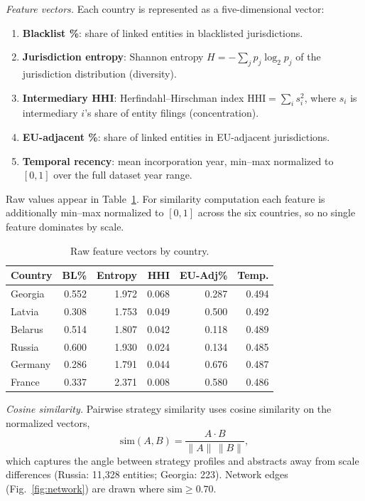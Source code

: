 \documentclass[9pt,twoside]{pnas-new}
\begin{document}
\textit{Feature vectors.} Each country is represented as a five-dimensional vector:
\begin{enumerate}
\item \textbf{Blacklist \%}: share of linked entities in blacklisted jurisdictions.
\item \textbf{Jurisdiction entropy}: Shannon entropy $H=-\sum_j p_j\log_2 p_j$ of the jurisdiction distribution (diversity).
\item \textbf{Intermediary HHI}: Herfindahl--Hirschman index $\text{HHI}=\sum_i s_i^2$, where $s_i$ is intermediary $i$'s share of entity filings (concentration).
\item \textbf{EU-adjacent \%}: share of linked entities in EU-adjacent jurisdictions.
\item \textbf{Temporal recency}: mean incorporation year, min--max normalized to $[0,1]$ over the full dataset year range.
\end{enumerate}
Raw values appear in Table~\ref{tab:features}. For similarity computation each feature is additionally min--max normalized to $[0,1]$ across the six countries, so no single feature dominates by scale.

\begin{table}[h!]
\centering
\caption{Raw feature vectors by country.}
\label{tab:features}
\begin{tabular}{lrrrrr}
Country & BL\% & Entropy & HHI & EU-Adj\% & Temp. \\
\midrule
Georgia  & 0.552 & 1.972 & 0.068 & 0.287 & 0.494 \\
Latvia   & 0.308 & 1.753 & 0.049 & 0.500 & 0.492 \\
Belarus  & 0.514 & 1.807 & 0.042 & 0.118 & 0.489 \\
Russia   & 0.600 & 1.930 & 0.024 & 0.134 & 0.485 \\
Germany  & 0.286 & 1.791 & 0.044 & 0.676 & 0.487 \\
France   & 0.337 & 2.371 & 0.008 & 0.580 & 0.486 \\
\bottomrule
\end{tabular}
\end{table}

\textit{Cosine similarity.} Pairwise strategy similarity uses cosine similarity on the normalized vectors,
\[
\text{sim}(A,B)=\frac{A\cdot B}{\lVert A\rVert\,\lVert B\rVert},
\]
which captures the angle between strategy profiles and abstracts away from scale differences (Russia: 11,328 entities; Georgia: 223). Network edges (Fig.~\ref{fig:network}) are drawn where $\text{sim}\geq 0.70$.
\end{document}
